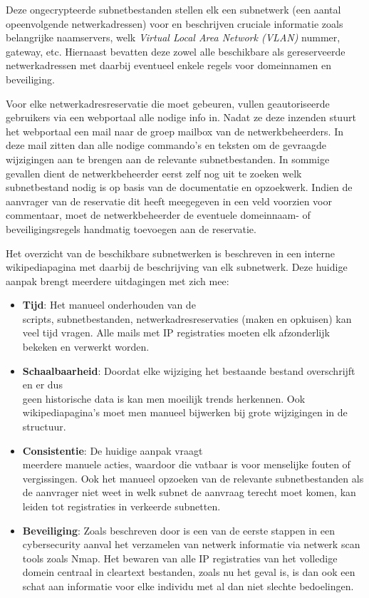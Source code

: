 \documentclass{hogent-article}
\begin{document}
Deze ongecrypteerde subnetbestanden stellen elk een subnetwerk (een aantal opeenvolgende netwerkadressen) voor en beschrijven cruciale informatie zoals belangrijke naamservers, welk \textit{Virtual Local Area Network (VLAN)} nummer, gateway, etc. Hiernaast bevatten deze zowel alle beschikbare als gereserveerde netwerkadressen met daarbij eventueel enkele regels voor domeinnamen en beveiliging.

Voor elke netwerkadresreservatie die moet gebeuren, vullen geautoriseerde gebruikers via een webportaal alle nodige info in.
Nadat ze deze inzenden stuurt het webportaal een mail naar de groep mailbox van de netwerkbeheerders.
In deze mail zitten dan alle nodige commando's en teksten om de gevraagde wijzigingen aan te brengen aan de relevante subnetbestanden. In sommige gevallen dient de netwerkbeheerder eerst zelf nog uit te zoeken welk subnetbestand nodig is op basis van de documentatie en opzoekwerk. Indien de aanvrager van de reservatie dit heeft meegegeven in een veld voorzien voor commentaar, moet de netwerkbeheerder de eventuele domeinnaam- of beveiligingsregels handmatig toevoegen aan de reservatie.

Het overzicht van de beschikbare subnetwerken is beschreven in een interne wikipediapagina met daarbij de beschrijving van elk subnetwerk. Deze huidige aanpak brengt meerdere uitdagingen met zich mee:
\begin{itemize}
    \item \textbf{Tijd}: Het manueel onderhouden van de \\scripts, subnetbestanden, netwerkadresreservaties (maken en opkuisen) kan veel tijd vragen. Alle mails met IP registraties moeten elk afzonderlijk bekeken en verwerkt worden.
    \item \textbf{Schaalbaarheid}: Doordat elke wijziging het bestaande bestand overschrijft en er dus \\geen historische data is kan men moeilijk trends herkennen. Ook wikipediapagina's moet men manueel bijwerken bij grote wijzigingen in de structuur.
    \item \textbf{Consistentie}: De huidige aanpak vraagt \\meerdere manuele acties, waardoor die vatbaar is voor menselijke fouten of vergissingen. Ook het manueel opzoeken van de relevante subnetbestanden als de aanvrager niet weet in welk subnet de aanvraag terecht moet komen, kan leiden tot registraties in verkeerde subnetten.  
    \item \textbf{Beveiliging}: Zoals beschreven door \textcite{Liao2020} is een van de eerste stappen in een cybersecurity aanval het verzamelen van netwerk informatie via netwerk scan tools zoals Nmap. Het bewaren van alle IP registraties van het volledige domein centraal in cleartext bestanden, zoals nu het geval is, is dan ook een schat aan informatie voor elke individu met al dan niet slechte bedoelingen.
\end{itemize}
\end{document}
